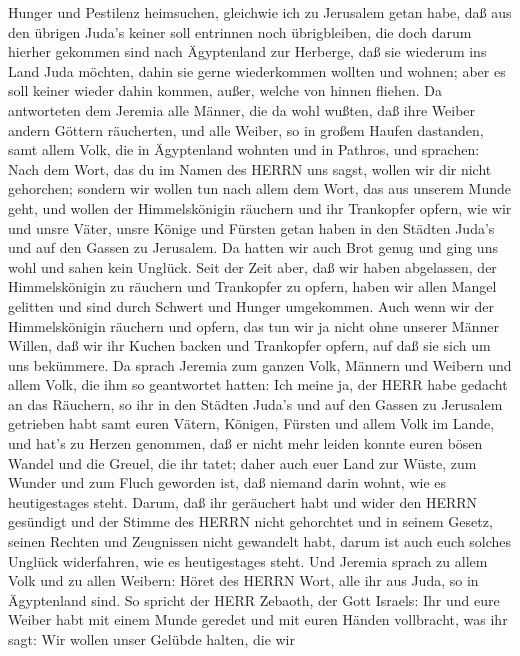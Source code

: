 Hunger und Pestilenz heimsuchen, gleichwie ich zu Jerusalem getan habe,
 daß aus den übrigen Juda's keiner soll entrinnen noch
übrigbleiben, die doch darum hierher gekommen sind nach Ägyptenland zur
Herberge, daß sie wiederum ins Land Juda möchten, dahin sie gerne
wiederkommen wollten und wohnen; aber es soll keiner wieder dahin
kommen, außer, welche von hinnen fliehen.  Da antworteten
dem Jeremia alle Männer, die da wohl wußten, daß ihre Weiber andern
Göttern räucherten, und alle Weiber, so in großem Haufen dastanden, samt
allem Volk, die in Ägyptenland wohnten und in Pathros, und sprachen:
 Nach dem Wort, das du im Namen des HERRN uns sagst, wollen
wir dir nicht gehorchen;  sondern wir wollen tun nach allem
dem Wort, das aus unserem Munde geht, und wollen der Himmelskönigin
räuchern und ihr Trankopfer opfern, wie wir und unsre Väter, unsre
Könige und Fürsten getan haben in den Städten Juda's und auf den Gassen
zu Jerusalem. Da hatten wir auch Brot genug und ging uns wohl und sahen
kein Unglück.  Seit der Zeit aber, daß wir haben
abgelassen, der Himmelskönigin zu räuchern und Trankopfer zu opfern,
haben wir allen Mangel gelitten und sind durch Schwert und Hunger
umgekommen.  Auch wenn wir der Himmelskönigin räuchern und
opfern, das tun wir ja nicht ohne unserer Männer Willen, daß wir ihr
Kuchen backen und Trankopfer opfern, auf daß sie sich um uns bekümmere.
 Da sprach Jeremia zum ganzen Volk, Männern und Weibern und
allem Volk, die ihm so geantwortet hatten:  Ich meine ja,
der HERR habe gedacht an das Räuchern, so ihr in den Städten Juda's und
auf den Gassen zu Jerusalem getrieben habt samt euren Vätern, Königen,
Fürsten und allem Volk im Lande, und hat's zu Herzen genommen,
 daß er nicht mehr leiden konnte euren bösen Wandel und die
Greuel, die ihr tatet; daher auch euer Land zur Wüste, zum Wunder und
zum Fluch geworden ist, daß niemand darin wohnt, wie es heutigestages
steht.  Darum, daß ihr geräuchert habt und wider den HERRN
gesündigt und der Stimme des HERRN nicht gehorchtet und in seinem
Gesetz, seinen Rechten und Zeugnissen nicht gewandelt habt, darum ist
auch euch solches Unglück widerfahren, wie es heutigestages steht.
 Und Jeremia sprach zu allem Volk und zu allen Weibern:
Höret des HERRN Wort, alle ihr aus Juda, so in Ägyptenland sind.
 So spricht der HERR Zebaoth, der Gott Israels: Ihr und
eure Weiber habt mit einem Munde geredet und mit euren Händen
vollbracht, was ihr sagt: Wir wollen unser Gelübde halten, die wir

